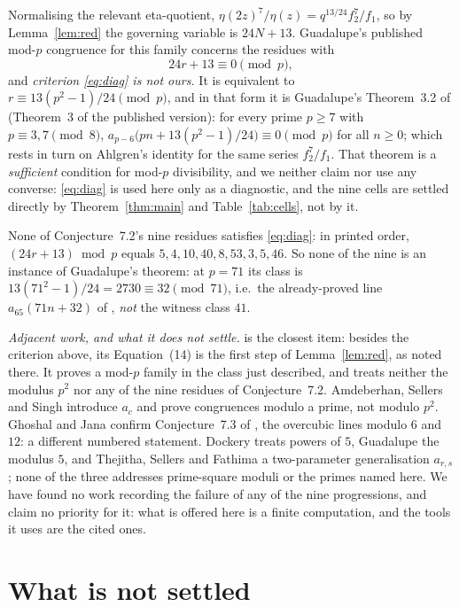 \documentclass[11pt]{amsart}
\theoremstyle{definition}
\theoremstyle{remark}
\begin{document}
Normalising the relevant eta-quotient, $\eta(2z)^{7}/\eta(z)=q^{13/24}f_2^{7}/f_1$, so by
Lemma~\ref{lem:red} the governing variable is $24N+13$. Guadalupe's published mod-$p$
congruence for this family concerns the residues with
\begin{equation}\label{eq:diag}
 24r+13\equiv0\pmod p ,
\end{equation}
and \emph{criterion \eqref{eq:diag} is not ours.} It is equivalent to
$r\equiv13(p^2-1)/24\pmod p$, and in that form it is Guadalupe's Theorem~3.2 of
\cite{Gua} (Theorem~3 of the published version): for every prime $p\ge7$ with
$p\equiv3,7\pmod 8$, $a_{p-6}\bigl(pn+13(p^2-1)/24\bigr)\equiv0\pmod p$ for all $n\ge0$;
which rests in turn on Ahlgren's identity \cite[p.~223]{Ahl} for the same series
$f_2^{7}/f_1$. That theorem is a \emph{sufficient} condition for mod-$p$ divisibility, and
we neither claim nor use any converse: \eqref{eq:diag} is used here only as a diagnostic,
and the nine cells are settled directly by Theorem~\ref{thm:main} and
Table~\ref{tab:cells}, not by it.

None of Conjecture~7.2's nine residues satisfies \eqref{eq:diag}: in printed order,
$(24r+13)\bmod p$ equals $5,4,10,40,8,53,3,5,46$. So none of the nine is an instance of
Guadalupe's theorem: at $p=71$ its class is $13(71^2-1)/24=2730\equiv32\pmod{71}$, i.e.\
the already-proved line $a_{65}(71n+32)$ of \cite{DMS}, \emph{not} the witness class $41$.

\emph{Adjacent work, and what it does not settle.} \cite{Gua} is the closest item: besides
the criterion above, its Equation~(14) is the first step of Lemma~\ref{lem:red}, as noted
there. It proves a mod-$p$ family in the class just described, and treats neither the
modulus $p^2$ nor any of the nine residues of Conjecture~7.2.
Amdeberhan, Sellers and Singh \cite{ASS} introduce $a_c$ and prove congruences modulo a
prime, not modulo $p^2$. Ghoshal and Jana \cite{GJ} confirm Conjecture~7.3 of \cite{DMS},
the overcubic lines modulo $6$ and $12$: a different numbered statement. Dockery
\cite{Doc} treats powers of $5$, Guadalupe \cite{Gua2} the modulus $5$, and Thejitha,
Sellers and Fathima \cite{TSF} a two-parameter generalisation $a_{r,s}$; none of the three
addresses prime-square moduli or the primes named here. We have found no work recording the
failure of any of the nine progressions, and claim no priority for it: what is offered here
is a finite computation, and the tools it uses are the cited ones.

\section{What is not settled}\label{sec:open}
\end{document}
